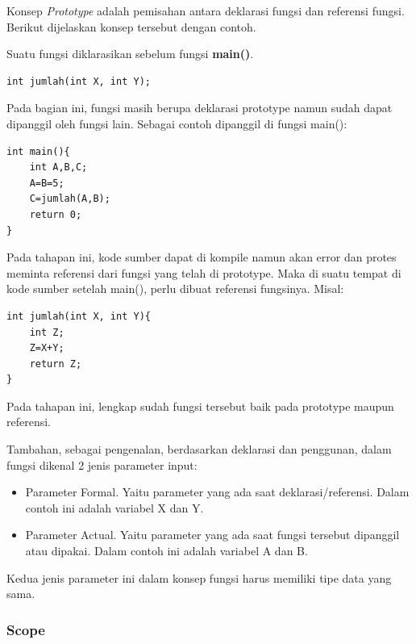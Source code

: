 \documentclass[12pt,]{article}
\begin{document}
	Konsep \textit{Prototype} adalah pemisahan antara deklarasi fungsi dan referensi fungsi.
	Berikut dijelaskan konsep tersebut dengan contoh.
	
	Suatu fungsi diklarasikan sebelum fungsi \textbf{main()}.
	\begin{verbatim}
int jumlah(int X, int Y);
	\end{verbatim}
	
	Pada bagian ini, fungsi masih berupa deklarasi prototype namun sudah dapat dipanggil oleh fungsi lain.
	Sebagai contoh dipanggil di fungsi main():
	\begin{verbatim}
int main(){
	int A,B,C;
	A=B=5;
	C=jumlah(A,B);
	return 0;
}
	\end{verbatim}
	
	Pada tahapan ini, kode sumber dapat di kompile namun akan error dan protes meminta referensi dari fungsi yang telah di prototype.
	Maka di suatu tempat di kode sumber setelah main(), perlu dibuat referensi fungsinya.
	Misal:
	\begin{verbatim}
int jumlah(int X, int Y){
	int Z;
	Z=X+Y;
	return Z;
}
	\end{verbatim}
	
	Pada tahapan ini, lengkap sudah fungsi tersebut baik pada prototype maupun referensi.
	
	Tambahan, sebagai pengenalan, berdasarkan deklarasi dan penggunan, dalam fungsi dikenal 2 jenis parameter input:
	\begin{itemize}
		\item Parameter Formal. Yaitu parameter yang ada saat deklarasi/referensi.
		Dalam contoh ini adalah variabel X dan Y.
		
		\item Parameter Actual. Yaitu parameter yang ada saat fungsi tersebut dipanggil atau dipakai.
		Dalam contoh ini adalah variabel A dan B.
	\end{itemize}

	Kedua jenis parameter ini dalam konsep fungsi harus memiliki tipe data yang sama.
	
	\subsubsection{Scope}
	
\end{document}
